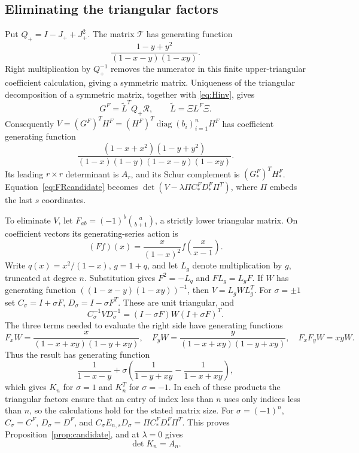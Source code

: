 \documentclass[11pt,a4paper]{amsart}
\theoremstyle{remark}\newtheorem{remark}[theorem]{Remark}
\numberwithin{equation}{section}
\DeclareMathOperator{\diag}{diag}
\begin{document}
\subsection{Eliminating the triangular factors}
Put $Q_+=I-J_++J_+^2$. The matrix $\mathcal T$ has generating function
\[
 \frac{1-y+y^2}{(1-x-y)(1-xy)}.
\]
Right multiplication by $Q_+^{-1}$ removes the numerator in this finite upper-triangular coefficient calculation, giving a symmetric matrix. Uniqueness of the triangular decomposition of a symmetric matrix, together with \eqref{eq:Hinv}, gives
\[
 G^F=\widetilde L^TQ_+\mathcal R,
 \qquad \widetilde L=\Xi L^F\Xi.
\]
Consequently $V=(G^F)^TH^F=(H^F)^T\diag(b_i)_{i=1}^nH^F$ has coefficient generating function
\begin{equation}\label{eq:Vgf}
 \frac{(1-x+x^2)(1-y+y^2)}{(1-x)(1-y)(1-x-y)(1-xy)}.
\end{equation}
Its leading $r\times r$ determinant is $A_r$, and its Schur complement is $(G^F_*)^TH^F_*$. Equation~\eqref{eq:FRcandidate} becomes
$\det(V-\lambda\Pi C^F_*D^F_*\Pi^T)$, where $\Pi$ embeds the last $s$ coordinates.

To eliminate $V$, let $F_{ab}=(-1)^b\binom a{b+1}$, a strictly lower triangular matrix. On coefficient vectors its generating-series action is
\[
 (Ff)(x)=\frac{x}{(1-x)^2}f\left(\frac{x}{x-1}\right).
\]
Write $q(x)=x^2/(1-x)$, $g=1+q$, and let $L_g$ denote multiplication by $g$, truncated at degree $n$. Substitution gives $F^2=-L_q$ and $FL_g=L_gF$. If $W$ has generating function $((1-x-y)(1-xy))^{-1}$, then $V=L_gWL_g^T$. For $\sigma=\pm1$ set $C_\sigma=I+\sigma F$, $D_\sigma=I-\sigma F^T$. These are unit triangular, and
\[
 C_\sigma^{-1}VD_\sigma^{-1}=(I-\sigma F)W(I+\sigma F)^T.
\]
The three terms needed to evaluate the right side have generating functions
\[
 F_xW=\frac{x}{(1-x+xy)(1-y+xy)},\quad
 F_yW=\frac{y}{(1-x+xy)(1-y+xy)},\quad F_xF_yW=xyW.
\]
Thus the result has generating function
\[
 \frac1{1-x-y}+\sigma\left(\frac1{1-y+xy}-\frac1{1-x+xy}\right),
\]
which gives $K_n$ for $\sigma=1$ and $K_n^T$ for $\sigma=-1$. In each of these products the triangular factors ensure that an entry of index less than $n$ uses only indices less than $n$, so the calculations hold for the stated matrix size.
For $\sigma=(-1)^n$, $C_\sigma=C^F$, $D_\sigma=D^F$, and
$C_\sigma E_{n,s}D_\sigma=\Pi C^F_*D^F_*\Pi^T$. This proves Proposition~\ref{prop:candidate}, and at $\lambda=0$ gives
\begin{equation}\label{eq:detK}\det K_n=A_n.\end{equation}
\end{document}

